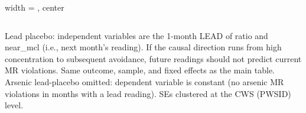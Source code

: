 \begin{table}[htbp]
\begin{adjustbox}{width = \textwidth, center}
\begin{tabular}{lcc}
         \bottomrule
         
      \end{tabular}
      
      
      
   \end{adjustbox}
      {\tiny\linespread{1}\selectfont \par \raggedright 
   Lead placebo: independent variables are the 1-month LEAD of ratio and near\_mcl (i.e., next month's reading). If the causal direction runs from high concentration to subsequent avoidance, future readings should not predict current MR violations. Same outcome, sample, and fixed effects as the main table. Arsenic lead-placebo omitted: dependent variable is constant (no arsenic MR violations in months with a lead reading). SEs clustered at the CWS (PWSID) level.}
   
\end{table}


